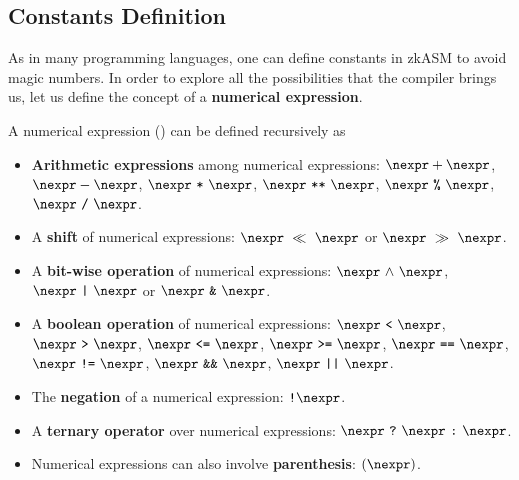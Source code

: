 








\subsection{Constants Definition} \label{sec:const-def}

As in many programming languages, one can define constants in zkASM to avoid magic numbers. In order to explore all the possibilities that the compiler brings us, let us define the concept of a \textbf{numerical expression}.

A numerical expression (\nexpr) can be defined recursively as 

\begin{itemize}

\item \textbf{Arithmetic expressions} among numerical expressions: $\nexpr + \nexpr$, $\nexpr - \nexpr$, $\nexpr \ \texttt{*} \ \nexpr$, $\nexpr \ \texttt{**} \ \nexpr$, $\nexpr \ \texttt{\%} \ \nexpr$, $\nexpr \ \texttt{/} \ \nexpr$. 

\item A \textbf{shift} of numerical expressions: $\nexpr \ \ll \ \nexpr$ or $\nexpr \ \gg \ \nexpr$. 

\item A \textbf{bit-wise operation} of numerical expressions: $\nexpr \ \mathtt{\land} \ \nexpr$, $\nexpr \ \texttt{|} \ \nexpr$ or $\nexpr \ \texttt{\&} \ \nexpr$.

\item A \textbf{boolean operation} of numerical expressions: $\nexpr \ \texttt{<} \ \nexpr$, $\nexpr \ \texttt{>} \ \nexpr$, $\nexpr \ \texttt{<=} \ \nexpr$, $\nexpr \ \texttt{>=} \ \nexpr$, $\nexpr \ \texttt{==} \ \nexpr$, $\nexpr \ \texttt{!=} \ \nexpr$, $\nexpr \ \texttt{\&\&} \ \nexpr$, $\nexpr \ \texttt{||} \ \nexpr$.

\item The \textbf{negation} of a numerical expression: $\texttt{!} \nexpr$. 

\item A \textbf{ternary operator} over numerical expressions: $ \nexpr \ \texttt{?} \ \nexpr \ \texttt{:} \ \nexpr$. 

\item Numerical expressions can also involve \textbf{parenthesis}: $( \nexpr )$. 

\end{itemize}

